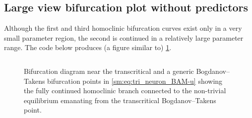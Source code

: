 \subsection{Large view bifurcation plot without predictors}
Although the first and third homoclinic bifurcation curves exist only in a very small
parameter region, the second is continued in a relatively large parameter range. The
code below produces (a figure similar to)
\cref{sm:fig:triNeuronBAMNeuralNetworkModelLargerBifurctionPlot}.
\inputminted[firstline=245, lastline=267]{MATLAB}{\pathToDDEBifToolDemos/BAM_neural_network_model/BAMnn.m}
\begin{figure}[ht]
    \caption{
    Bifurcation diagram near the transcritical and
    a generic Bogdanov--Takens bifurcation points in \cref{sm:eq:tri_neuron_BAM-u} showing the fully
    continued homoclinic branch connected to the non-trivial equilibrium emanating
    from the transcritical Bogdanov--Takens point.}
    \label{sm:fig:triNeuronBAMNeuralNetworkModelLargerBifurctionPlot}
\end{figure}

